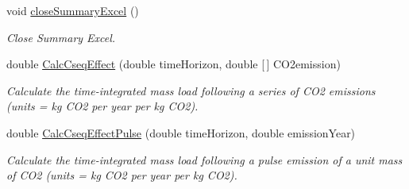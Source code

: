 \begin{DoxyCompactItemize}
void \mbox{\hyperlink{class_global_vars_aceec9231298720952c74d5694f19265e}{close\+Summary\+Excel}} ()
\begin{DoxyCompactList}\small\item\em Close Summary Excel. \end{DoxyCompactList}\item 
double \mbox{\hyperlink{class_global_vars_a4ff00f80fd4199c713d481bae6213d96}{Calc\+Cseq\+Effect}} (double time\+Horizon, double \mbox{[}$\,$\mbox{]} C\+O2emission)
\begin{DoxyCompactList}\small\item\em Calculate the time-\/integrated mass load following a series of C\+O2 emissions (units = kg C\+O2 per year per kg C\+O2). \end{DoxyCompactList}\item 
double \mbox{\hyperlink{class_global_vars_a04a94dd0bc66a17669168de6a5dee129}{Calc\+Cseq\+Effect\+Pulse}} (double time\+Horizon, double emission\+Year)
\begin{DoxyCompactList}\small\item\em Calculate the time-\/integrated mass load following a pulse emission of a unit mass of C\+O2 (units = kg C\+O2 per year per kg C\+O2). \end{DoxyCompactList}\end{DoxyCompactItemize}
